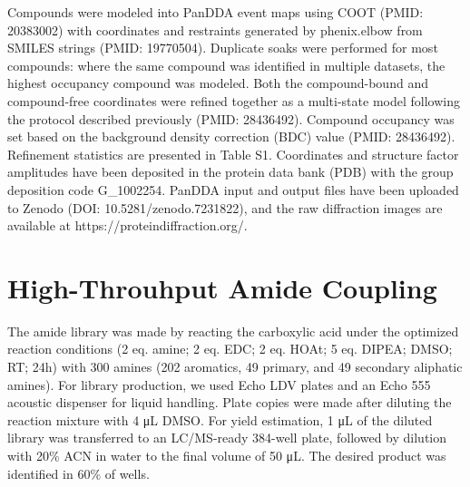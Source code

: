 Compounds were modeled into PanDDA event maps using COOT (PMID: 20383002) with coordinates and restraints generated by phenix.elbow from SMILES strings (PMID: 19770504). Duplicate soaks were performed for most compounds: where the same compound was identified in multiple datasets, the highest occupancy compound was modeled. Both the compound-bound and compound-free coordinates were refined together as a multi-state model following the protocol described previously (PMID: 28436492). Compound occupancy was set based on the background density correction (BDC) value (PMID: 28436492). Refinement statistics are presented in Table S1. Coordinates and structure factor amplitudes have been deposited in the protein data bank (PDB) with the group deposition code G\_1002254. PanDDA input and output files have been uploaded to Zenodo (DOI: 10.5281/zenodo.7231822), and the raw diffraction images are available at https://proteindiffraction.org/.

\section{High-Throuhput Amide Coupling} \label{appendix:amide_coupling}
The amide library was made by reacting the carboxylic acid under the optimized reaction conditions (2 eq. amine; 2 eq. EDC; 2 eq. HOAt; 5 eq. DIPEA; DMSO; RT; 24h) with 300 amines (202 aromatics, 49 primary, and 49 secondary aliphatic amines). For library production, we used Echo LDV plates and an Echo 555 acoustic dispenser for liquid handling. Plate copies were made after diluting the reaction mixture with 4 μL DMSO. For yield estimation, 1 μL of the diluted library was transferred to an LC/MS-ready 384-well plate, followed by dilution with 20\% ACN in water to the final volume of 50 μL. The desired product was identified in 60\% of wells.